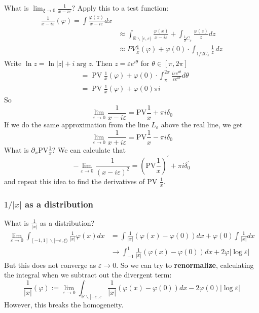What is $\lim _{\xi \rightarrow 0} \frac{1}{x-i \varepsilon} ?$ Apply this to a test function:
$$
\begin{aligned}
\frac{1}{x-i \varepsilon}(\varphi)=\int \frac{\varphi(x)}{x-i \varepsilon} d x & \\
& \approx \int_{\mathbb{R} \backslash[\varepsilon, \varepsilon)} \frac{\varphi(x)}{x-i \varepsilon}+\int_{\frac{1}{2} C_{\varepsilon}} \frac{\varphi(z)}{z} d z\\
& \approx PV \frac{1}{x}(\varphi) + \varphi(0)\cdot \int_{1/2 C_{\varepsilon}}\frac{1}{z} \,dz
\end{aligned}
$$
Write $\ln z=\ln |z|+i \arg z .$ Then $z=\varepsilon e^{i \theta}$ for $\theta \in[\pi, 2 \pi]$
$$
\begin{aligned}
&=\operatorname{PV} \frac{1}{x}(\varphi)+\varphi(0) \cdot \int_{\pi}^{2 \pi} \frac{i \varepsilon e^{i \theta}}{\varepsilon e^{i \theta}} d \theta \\
&=\operatorname{PV} \frac{1}{x}(\varphi)+\varphi(0) \pi i
\end{aligned}
$$
So
$$
\lim _{\varepsilon \rightarrow 0} \frac{1}{x-i \varepsilon}=\mathrm{PV} \frac{1}{x}+\pi i \delta_{0}
$$
If we do the same approximation from the line $L_{\varepsilon}$ above the real line, we get
$$
\lim _{\varepsilon \rightarrow 0} \frac{1}{x+i \varepsilon}=\mathrm{PV} \frac{1}{x}-\pi i \delta_{0}
$$
What is $\partial_{x} \mathrm{PV} \frac{1}{x} ?$ We can calculate that
$$
-\lim _{\varepsilon \rightarrow 0} \frac{1}{(x-i \varepsilon)^2}=\left(\mathrm{PV} \frac{1}{x}\right)^{\prime}+\pi i \delta_{0}^{\prime}
$$
and repeat this idea to find the derivatives of PV $\frac{1}{x}$.

\subsubsection{$1/|x|$ as a distribution}
What is $\frac{1}{|x|}$ as a distribution?
$$
\begin{aligned}
\lim _{\varepsilon \rightarrow 0} \int_{[-1,1] \backslash[-\varepsilon, \xi)} \frac{1}{|x|} \varphi(x) d x &=\int \frac{1}{|x|}(\varphi(x)-\varphi(0)) d x+\varphi(0) \int \frac{1}{|x|} d x \\
& \rightarrow \int_{-1}^{1} \frac{1}{|x|}(\varphi(x)-\varphi(0)) d x+2 \varphi|\log \varepsilon|
\end{aligned}
$$
But this does not converge as $\varepsilon \rightarrow 0$. So we can try to \textbf{renormalize}, calculating the integral when we subtract out the divergent term:
$$
\frac{1}{|x|}(\varphi):=\lim _{\varepsilon \rightarrow 0} \int_{\mathbb{R} \backslash[-\varepsilon, \varepsilon} \frac{1}{|x|}(\varphi(x)-\varphi(0)) d x-2 \varphi(0)|\log \varepsilon|
$$
However, this breaks the homogeneity.

